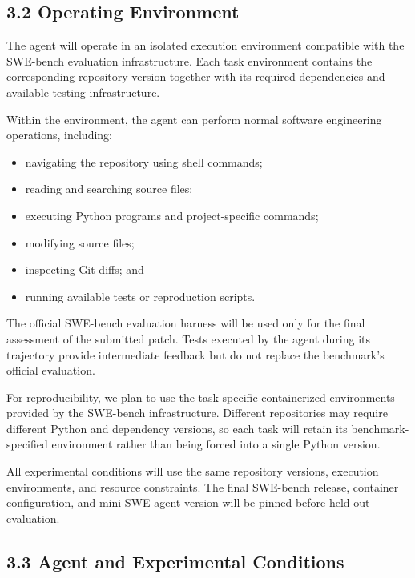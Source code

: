 \documentclass[11pt]{article}
\begin{document}
\subsection*{3.2 Operating Environment}

The agent will operate in an isolated execution environment compatible
with the SWE-bench evaluation infrastructure. Each task environment
contains the corresponding repository version together with its required
dependencies and available testing infrastructure.

Within the environment, the agent can perform normal software engineering
operations, including:

\begin{itemize}[leftmargin=*, itemsep=0.25em]
    \item navigating the repository using shell commands;
    \item reading and searching source files;
    \item executing Python programs and project-specific commands;
    \item modifying source files;
    \item inspecting Git diffs; and
    \item running available tests or reproduction scripts.
\end{itemize}

The official SWE-bench evaluation harness will be used only for the final
assessment of the submitted patch. Tests executed by the agent during its
trajectory provide intermediate feedback but do not replace the benchmark's
official evaluation.

For reproducibility, we plan to use the task-specific containerized
environments provided by the SWE-bench infrastructure. Different
repositories may require different Python and dependency versions, so
each task will retain its benchmark-specified environment rather than
being forced into a single Python version.

All experimental conditions will use the same repository versions,
execution environments, and resource constraints. The final SWE-bench
release, container configuration, and mini-SWE-agent version will be
pinned before held-out evaluation.


\subsection*{3.3 Agent and Experimental Conditions}
\end{document}
